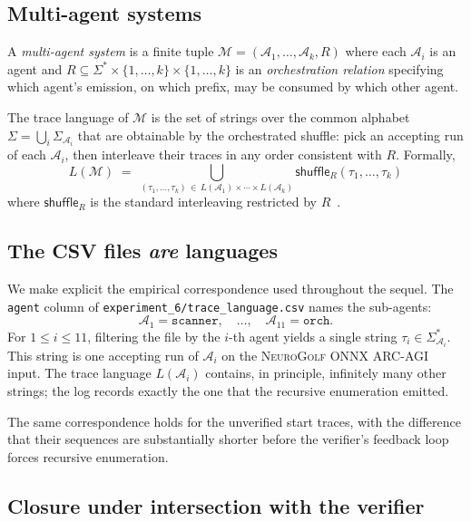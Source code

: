 \subsection{Multi-agent systems}

\begin{definition}
\label{def:multi}
A \emph{multi-agent system} is a finite tuple $\mathcal{M} =
(\mathcal{A}_1, \dots, \mathcal{A}_k, R)$ where each
$\mathcal{A}_i$ is an agent and $R \subseteq \Sigma^*\times\{1,
\dots,k\}\times\{1,\dots,k\}$ is an \emph{orchestration relation}
specifying which agent's emission, on which prefix, may be
consumed by which other agent.
\end{definition}

The trace language of $\mathcal{M}$ is the set of strings over the
common alphabet $\Sigma = \bigcup_i \Sigma_{\mathcal{A}_i}$ that
are obtainable by the orchestrated shuffle: pick an accepting run
of each $\mathcal{A}_i$, then interleave their traces in any order
consistent with $R$.  Formally,
\[
L(\mathcal{M}) \;=\;
\bigcup_{(\tau_1, \dots, \tau_k)\,\in\,
        L(\mathcal{A}_1)\times\cdots\times L(\mathcal{A}_k)}
\textsf{shuffle}_R(\tau_1, \dots, \tau_k)
\]
where $\textsf{shuffle}_R$ is the standard interleaving
restricted by $R$~\cite{hopcroft2006automata}.

\subsection{The CSV files \emph{are} languages}

We make explicit the empirical correspondence used throughout the
sequel.  The \texttt{agent} column of \texttt{experiment\_6/trace\_language.csv}
names the sub-agents:
\[
\mathcal{A}_1 = \texttt{scanner},\quad
\dots,\quad
\mathcal{A}_{11} = \texttt{orch}.
\]
For $1\le i\le 11$, filtering the file by the $i$-th agent
yields a single string $\tau_i \in \Sigma_{\mathcal{A}_i}^*$.
This string is one accepting run of $\mathcal{A}_i$ on the
\textsc{NeuroGolf ONNX ARC-AGI} input.  The trace language
$L(\mathcal{A}_i)$ contains, in principle, infinitely many other
strings; the log records exactly the one that the
recursive enumeration emitted.

The same correspondence holds for the unverified start traces,
with the difference that their sequences are substantially shorter
before the verifier's feedback loop forces recursive enumeration.

\subsection{Closure under intersection with the verifier}

